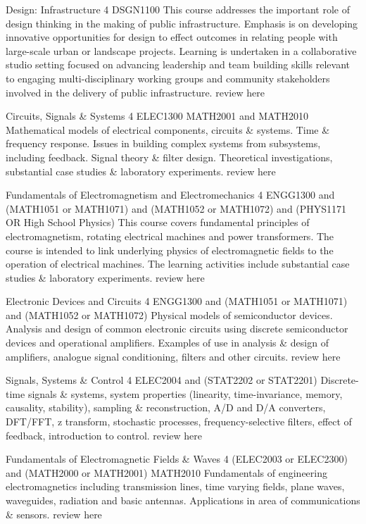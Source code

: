 	{Design: Infrastructure}
	{4}
	{DSGN1100}
	{}
	{}
	{This course addresses the important role of design thinking in the making of public infrastructure. Emphasis is on developing innovative opportunities for design to effect outcomes in relating people with large-scale urban or landscape projects. Learning is undertaken in a collaborative studio setting focused on advancing leadership and team building skills relevant to engaging multi-disciplinary working groups and community stakeholders involved in the delivery of public infrastructure.}
	{review here}

	{Circuits, Signals \& Systems}
	{4}
	{ELEC1300}
	{}
	{MATH2001 and MATH2010}
	{Mathematical models of electrical components, circuits \& systems. Time \& frequency response. Issues in building complex systems from subsystems, including feedback. Signal theory \& filter design. Theoretical investigations, substantial case studies \& laboratory experiments.}
	{review here}

	{Fundamentals of Electromagnetism and Electromechanics}
	{4}
	{ENGG1300 and (MATH1051 or MATH1071) and (MATH1052 or MATH1072) and (PHYS1171 OR High School Physics)}
	{}
	{}
	{This course covers fundamental principles of electromagnetism, rotating electrical machines and power transformers. The course is intended to link underlying physics of electromagnetic fields to the operation of electrical machines. The learning activities include substantial case studies \& laboratory experiments.}
	{review here}

	{Electronic Devices and Circuits}
	{4}
	{ENGG1300 and (MATH1051 or MATH1071) and (MATH1052 or MATH1072)}
	{}
	{}
	{Physical models of semiconductor devices. Analysis and design of common electronic circuits using discrete semiconductor devices and operational amplifiers. Examples of use in analysis \& design of amplifiers, analogue signal conditioning, filters and other circuits.}
	{review here}

	{Signals, Systems \& Control}
	{4}
	{ELEC2004 and (STAT2202 or STAT2201)}
	{}
	{}
	{Discrete-time signals \& systems, system properties (linearity, time-invariance, memory, causality, stability), sampling \& reconstruction, A/D and D/A converters, DFT/FFT, z transform, stochastic processes, frequency-selective filters, effect of feedback, introduction to control.}
	{review here}

	{Fundamentals of Electromagnetic Fields \& Waves}
	{4}
	{(ELEC2003 or ELEC2300) and (MATH2000 or MATH2001)}
	{}
	{MATH2010}
	{Fundamentals of engineering electromagnetics including transmission lines, time varying fields, plane waves, waveguides, radiation and basic antennas. Applications in area of communications \& sensors.}
	{review here}

